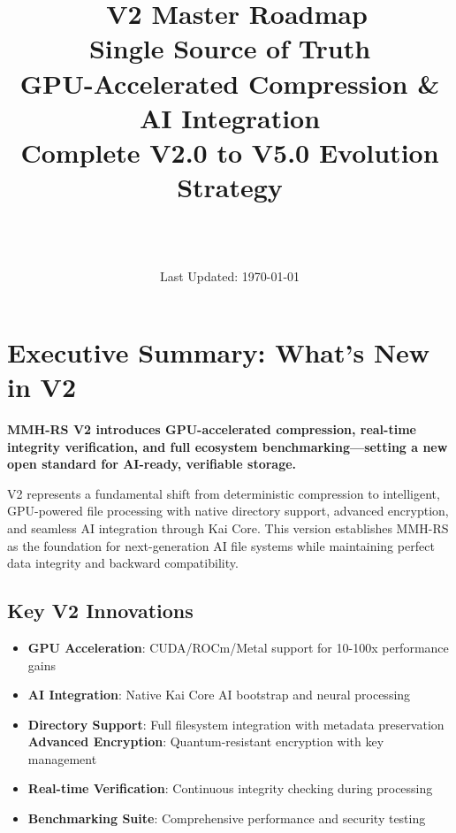 \documentclass[12pt,a4paper]{article}
\title{\Huge\textbf{\project\ V2 Master Roadmap}\\[0.5cm]
\Large\textbf{Single Source of Truth}\\[0.3cm]
\large GPU-Accelerated Compression \& AI Integration\\[0.5cm]
\large Complete V2.0 to V5.0 Evolution Strategy}
\author{\Large\authorname\\[0.2cm]\email\\[0.2cm]\github}
\date{\large Last Updated: \today}
\begin{document}
\maketitle
\thispagestyle{empty}

\tableofcontents
\newpage

\section{Executive Summary: What's New in V2}

\begin{tcolorbox}[colback=v2blue!10,colframe=v2blue!50,title=\textbf{MMH-RS V2 Executive Summary}]
\textbf{MMH-RS V2 introduces GPU-accelerated compression, real-time integrity verification, and full ecosystem benchmarking—setting a new open standard for AI-ready, verifiable storage.}

V2 represents a fundamental shift from deterministic compression to intelligent, GPU-powered file processing with native directory support, advanced encryption, and seamless AI integration through Kai Core. This version establishes MMH-RS as the foundation for next-generation AI file systems while maintaining perfect data integrity and backward compatibility.
\end{tcolorbox}

\subsection{Key V2 Innovations}
\begin{itemize}
    \item \textbf{GPU Acceleration}: CUDA/ROCm/Metal support for 10-100x performance gains
    \item \textbf{AI Integration}: Native Kai Core AI bootstrap and neural processing
    \item \textbf{Directory Support}: Full filesystem integration with metadata preservation
    \textbf{Advanced Encryption}: Quantum-resistant encryption with key management
    \item \textbf{Real-time Verification}: Continuous integrity checking during processing
    \item \textbf{Benchmarking Suite}: Comprehensive performance and security testing
\end{itemize}
\end{document}
